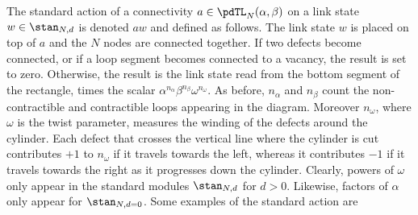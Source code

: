 \documentclass[11pt]{article}
\numberwithin{equation}{section}
\theoremstyle{plain}
\numberwithin{equation}{section}
\begin{document}
The standard action of a connectivity $a \in \pdTL_N(\alpha,\beta)$ on a link state $w\in \stan_{N,d}$ is denoted $a w$ and defined as follows. The link state $w$ is placed on top of $a$ and the $N$ nodes are connected together. If two defects become connected, or if a loop segment becomes connected to a vacancy, the result is set to zero. Otherwise, the result is the link state read from the bottom segment of the rectangle, times the scalar $\alpha^{n_\alpha}\beta^{n_\beta}\omega^{n_\omega}$. As before, $n_\alpha$ and $n_\beta$ count the non-contractible and contractible loops appearing in the diagram. Moreover $n_\omega$, where $\omega$ is the twist parameter, measures the winding of the defects around the cylinder. Each defect that crosses the vertical line where the cylinder is cut contributes $+1$ to $n_\omega$ if it travels towards the left, whereas it contributes $-1$ if it travels towards the right as it progresses down the cylinder. Clearly, powers of $\omega$ only appear in the standard modules $\stan_{N,d}$ for $d>0$. Likewise, factors of $\alpha$ only appear for $\stan_{N,d=0}$. Some examples of the standard action are
\end{document}

